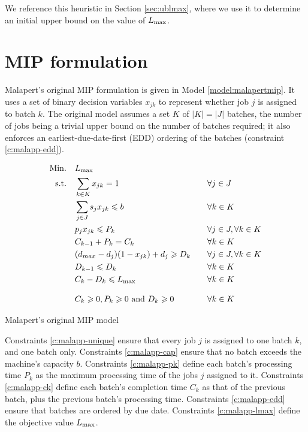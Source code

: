 \documentclass[13pt, letterpaper, oneside]{book}
\begin{document}
We reference this heuristic in Section \ref{sec:ublmax}, where we use it to
determine an initial upper bound on the value of $L_{\text{max}}$.

\section{MIP formulation}
\label{sec:malapertmip}
Malapert's original MIP formulation is given in Model \ref{model:malapertmip}. It
uses a set of binary decision variables $x_{jk}$ to represent whether job $j$ is
assigned to batch $k$. The original model assumes a set $K$ of $|K| = |J|$
batches, the number of jobs being a trivial upper bound on the number of batches
required; it also enforces an earliest-due-date-first (EDD) ordering of the
batches (constraint \eqref{c:malapp-edd}).

\begin{model}[h]
\begin{alignat}{2}
\mathrm{Min.}\quad & L_{\text{max}} && \\
\mathrm{s.t.}\quad &\sum_{k \in K} x_{jk} = 1 \quad && \forall j \in J
\label{c:malapp-unique}\\
  &\sum_{j \in J} s_j x_{jk} \leqslant b \quad && \forall k \in K\label{c:malapp-cap}\\
  &p_j x_{jk} \leqslant P_k \quad && \forall j \in J, \forall k \in
  K\label{c:malapp-pk}\\
  &C_{k-1} + P_{k} = C_k \quad && \forall k \in K\label{c:malapp-ck}\\
  &(d_{max} - d_j)(1 - x_{jk}) + d_j \geqslant D_k \quad && \forall j \in J, \forall
  k \in K\label{c:malapp-dk}\\
  &D_{k-1} \leqslant D_k \quad && \forall k \in K \label{c:malapp-edd} \\
  &C_k - D_k \leqslant L_{\text{max}} \quad && \forall k \in K\label{c:malapp-lmax}\\[2ex]
  &C_k \geqslant 0, P_k \geqslant 0 \text{ and } D_k \geqslant 0 \quad && \forall k \in K  
\end{alignat}
\caption{Malapert's original MIP model}
\label{model:malapertmip}
\end{model}

Constraints \eqref{c:malapp-unique} ensure that every job $j$ is assigned to
one batch $k$, and one batch only. Constraints \eqref{c:malapp-cap} ensure that
no batch exceeds the machine's capacity $b$. Constraints \eqref{c:malapp-pk}
define each batch's processing time $P_k$ as the maximum processing time of the
jobs $j$ assigned to it. Constraints \eqref{c:malapp-ck} define each batch's
completion time $C_k$ as that of the previous batch, plus the previous batch's
processing time. Constraints \eqref{c:malapp-edd} ensure that batches are
ordered by due date. Constraints \eqref{c:malapp-lmax} define the objective
value $L_{\text{max}}$.
\end{document}
